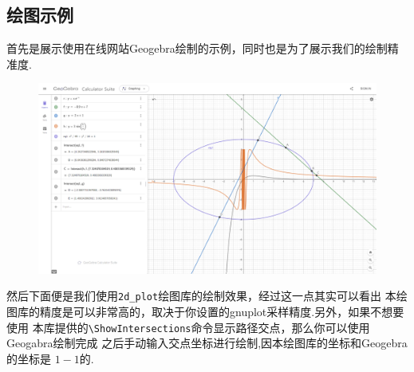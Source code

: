 \documentclass[12pt]{article}
\begin{document}
\subsection{绘图示例}
首先是展示使用在线网站Geogebra绘制的示例，同时也是为了展示我们的绘制精准度.
\begin{figure}[!htb]
    \centering
    \includegraphics[width=.95\linewidth]{./shoots.png}
\end{figure}


然后下面便是我们使用\texttt{2d\_plot}绘图库的绘制效果，经过这一点其实可以看出
本绘图库的精度是可以非常高的，取决于你设置的gnuplot采样精度.另外，如果不想要使用
本库提供的\verb|\ShowIntersections|命令显示路径交点，那么你可以使用Geogabra绘制完成
之后手动输入交点坐标进行绘制,因本绘图库的坐标和Geogebra的坐标是 $1-1$的.
\end{document}
